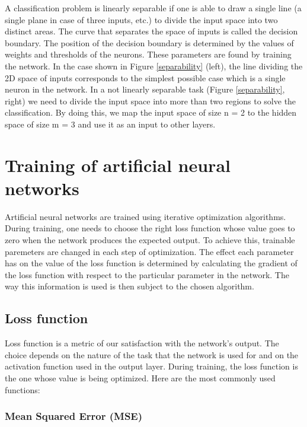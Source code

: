 A classification problem is linearly separable if one is able to draw a single line (a single plane in case of three inputs, etc.) to divide the input space into two distinct areas. The curve that separates the space of inputs is called the decision boundary. The position of the decision boundary is determined by the values of weights and thresholds of the neurons. These parameters are found by training the network. In the case shown in Figure \ref{separability} (left), the line dividing the 2D space of inputs corresponds to the simplest possible case which is a single neuron in the network. In a not linearly separable task (Figure \ref{separability}, right) we need to divide the input space into more than two regions to solve the classification. By doing this, we map the input space of size n = 2 to the hidden space of size m = 3 and use it as an input to other layers. \cite{mehlig}


\newpage

\section{Training of artificial neural networks}

Artificial neural networks are trained using iterative optimization algorithms. During training, one needs to choose the right loss function whose value goes to zero when the network produces the expected output. To achieve this, trainable paremeters are changed in each step of optimization. The effect each parameter has on the value of the loss function is determined by calculating the gradient of the loss function with respect to the particular parameter in the network. The way this information is used is then subject to the chosen algorithm. \cite{notes}

\subsection{Loss function}

Loss function is a metric of our satisfaction with the network's output. The choice depends on the nature of the task that the network is used for and on the activation function used in the output layer. During training, the loss function is the one whose value is being optimized. Here are the most commonly used functions: \cite{mehlig}


\subsubsection{Mean Squared Error (MSE)}

